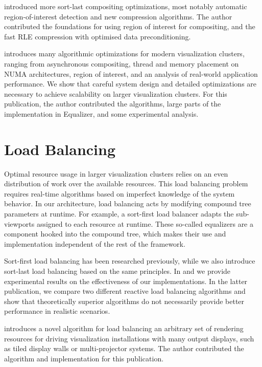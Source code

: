 \cite{MEP:10} introduced more sort-last compositing optimizations, most notably
automatic region-of-interest detection and new compression algorithms. The
author contributed the foundations for using region of interest for compositing,
and the fast RLE compression with optimised data preconditioning.

\cite{EBAHMP:12} introduces many algorithmic optimizations for modern
visualization clusters, ranging from asynchronous compositing, thread and
memory placement on NUMA architectures, region of interest, and an analysis of
real-world application performance. We show that careful system design and
detailed optimizations are necessary to achieve scalability on larger
visualization clusters. For this publication, the author contributed the
algorithms, large parts of the implementation in Equalizer, and some
experimental analysis.

\section{Load Balancing}

Optimal resource usage in larger visualization clusters relies on an even
distribution of work over the available resources. This load balancing problem
requires real-time algorithms based on imperfect knowledge of the system
behavior. In our architecture, load balancing acts by modifying compound tree
parameters at runtime. For example, a sort-first load balancer adapts the
sub-viewports assigned to each resource at runtime. These so-called
\textsf{equalizers} are a component hooked into the compound tree, which makes
their use and implementation independent of the rest of the framework.

Sort-first load balancing has been researched previously, while we also
introduce sort-last load balancing based on the same principles. In
\cite{EMP:09} and \cite{ESP:18} we provide experimental results on the
effectiveness of our implementations. In the latter publication, we compare two
different reactive load balancing algorithms and show that theoretically
superior algorithms do not necessarily provide better performance in realistic
scenarios.

\cite{EEP:11} introduces a novel algorithm for load balancing an arbitrary set
of rendering resources for driving visualization installations with many output
displays, such as tiled display walls or multi-projector systems. The author
contributed the algorithm and implementation for this publication.

